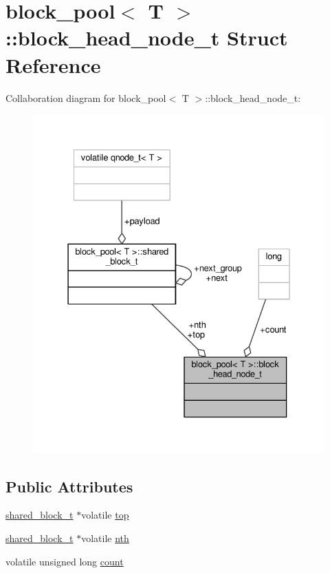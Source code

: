 \hypertarget{structblock__pool_1_1block__head__node__t}{\section{block\-\_\-pool$<$ T $>$\-:\-:block\-\_\-head\-\_\-node\-\_\-t Struct Reference}
\label{structblock__pool_1_1block__head__node__t}
}


Collaboration diagram for block\-\_\-pool$<$ T $>$\-:\-:block\-\_\-head\-\_\-node\-\_\-t\-:
\nopagebreak
\begin{figure}[H]
\begin{center}
\leavevmode
\includegraphics[width=331pt]{structblock__pool_1_1block__head__node__t__coll__graph}
\end{center}
\end{figure}
\subsection*{Public Attributes}
\begin{DoxyCompactItemize}
\item 
\hyperlink{structblock__pool_1_1shared__block__t}{shared\-\_\-block\-\_\-t} $\ast$volatile \hyperlink{structblock__pool_1_1block__head__node__t_a0b7d249e7dd99ce8039e75200e938c47}{top}
\item 
\hyperlink{structblock__pool_1_1shared__block__t}{shared\-\_\-block\-\_\-t} $\ast$volatile \hyperlink{structblock__pool_1_1block__head__node__t_a94ef0e4bb8ab14ab22b072930932dfce}{nth}
\item 
volatile unsigned long \hyperlink{structblock__pool_1_1block__head__node__t_ae3c6e1b84fef78f3bb4ed7dafd4d2e87}{count}
\end{DoxyCompactItemize}


